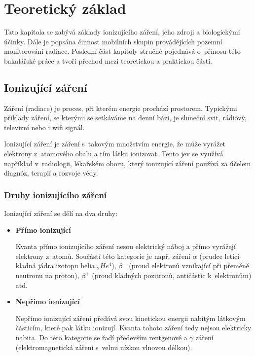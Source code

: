 \chapter{Teoretický základ}
\label{2-teorie}
Tato kapitola se zabývá základy ionizujícího záření, jeho zdroji a biologickými účinky. Dále je popsána činnost mobilních skupin provádějících pozemní monitorování radiace. Poslední část kapitoly stručně pojednává o~přínosu této bakalářské práce a tvoří přechod mezi teoretickou a praktickou částí.

\section{Ionizující záření}
	
Záření (radiace) je proces, při kterém energie prochází prostorem. Typickými příklady záření, se kterými se setkáváme na denní bázi, je sluneční svit, rádiový, televizní nebo i wifi signál. 

Ionizující záření je záření s~takovým množstvím energie, že může vyrážet elektrony z~atomového obalu a tím látku ionizovat. Tento jev se využívá například v~radiologii, lékařském oboru, který ionizující záření používá za účelem diagnóz, terapií a rozvoje vědy. \citep{who}

\subsection{Druhy ionizujícího záření} 
Ionizující záření se dělí na dva druhy: \cite{ionZarUllman} \cite{CEZ}

\begin{itemize}
	\item \textbf{Přímo ionizující}
	
		Kvanta přímo ionizujícího záření nesou elektrický náboj a přímo vyrážejí elektrony z~atomů. Součástí této kategorie je např. záření $\alpha$ (prudce letící kladná jádra izotopu helia $_{2}He^{4}$), $\beta^{-}$ (proud elektronů vznikající při přeměně neutronu na proton), $\beta^{+}$ (proud kladných pozitronů, antičástic k~elektronům) atd.
		 
	\item \textbf{Nepřímo ionizující}
	
		Nepřímo ionizující záření předává svou kinetickou energii nabitým látkovým částicím, které pak látku ionizují. Kvanta tohoto záření tedy nejsou elektricky nabita. Do této kategorie se řadí především rentgenové a $\gamma$ záření (elektromagnetická záření s~velmi nízkou vlnovou délkou). 
\end{itemize}

